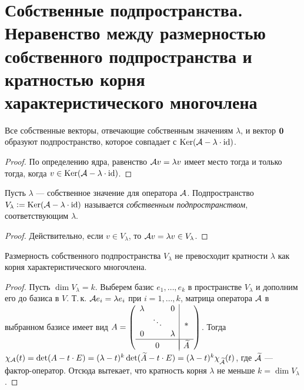 \section{Собственные подпространства. Неравенство между размерностью собственного подпространства и кратностью корня характеристического многочлена}

\begin{proposal}
    Все собственные векторы, отвечающие собственным значениям $\lambda$, и вектор $\boldsymbol{0}$ образуют подпространство, которое совпадает с $\operatorname{Ker}(\mathcal{A} - \lambda \cdot \mathrm{id})$.
\end{proposal}

\begin{proof}
    По определению ядра, равенство $\mathcal{A} v = \lambda v$ имеет место тогда и только тогда, когда $v \in \operatorname{Ker}(\mathcal{A} - \lambda \cdot \mathrm{id})$.
\end{proof}

\begin{definition}
    Пусть $\lambda$ --- собственное значение для оператора $\mathcal{A}$. Подпространство $V_\lambda \vcentcolon = \operatorname{Ker}(\mathcal{A} - \lambda \cdot \mathrm{id})$ называется \textit{собственным подпространством}, соответствующим $\lambda$.
\end{definition}

\begin{proof}
    Действительно, если $v \in V_\lambda$, то $\mathcal{A} v = \lambda v \in V_\lambda$.
\end{proof}

\begin{proposal}
    Размерность собственного подпространства $V_\lambda$ не превосходит кратности $\lambda$ как корня характеристического многочлена.
\end{proposal}

\begin{proof}
    Пусть $\dim V_\lambda = k$. Выберем базис $e_1, \ldots, e_k$ в пространстве $V_\lambda$ и дополним его до базиса в $V$. Т.\,к. $\mathcal{A} e_i = \lambda e_i$ при $i = 1, \ldots, k$, матрица оператора $\mathcal{A}$ в выбранном базисе имеет вид
    $
    A = 
    \left(
    \begin{array}{c c c | c}
        \lambda & & 0 & \\
         & \ddots & & \ast\\
        0 & & \lambda & \\
        \hline
         & & & \vspace{-4mm}\\
         & 0 & & \widetilde{A}
    \end{array}
    \right)
    $. Тогда $\chi_{\mathcal{A}}(t) = \det(A - t \cdot E) = (\lambda - t)^k\det(\widetilde{A} - t \cdot E) = (\lambda - t)^k\chi_{\widetilde{\mathcal{A}}}(t)$, где $\widetilde{\mathcal{A}}$ --- фактор-оператор. Отсюда вытекает, что кратность корня $\lambda$ не меньше $k = \dim V_\lambda$.
\end{proof}


